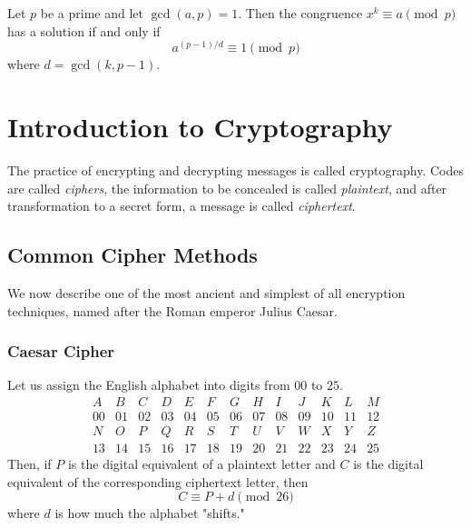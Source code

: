 \documentclass{article}
\begin{document}
\begin{corollary}
  \label{thm:eulers-criterion-for-kth-power-residues}
Let $p$ be a prime and let $\gcd(a, p) = 1$. Then the congruence $x^k \equiv a \pmod{p}$ has a solution if and only if 
\begin{equation}
  a^{(p-1)/d} \equiv 1 \pmod{p}
\end{equation}
where $d = \gcd(k, p-1)$. 
\end{corollary}

\section{Introduction to Cryptography}

The practice of encrypting and decrypting messages is called cryptography. Codes are called \textit{ciphers}, the information to be concealed is called \textit{plaintext}, and after transformation to a secret form, a message is called \textit{ciphertext}. 

\subsection{Common Cipher Methods}

We now describe one of the most ancient and simplest of all encryption techniques, named after the Roman emperor Julius Caesar. 

\subsubsection{Caesar Cipher}
Let us assign the English alphabet into digits from $00$ to $25$. 
\begin{equation}
  \begin{array}{cccccccccccccc}
      A & B & C & D& E & F & G&H&I&J&K&L&M \\
      00 & 01 & 02 & 03 & 04&05&06&07&08&09&10&11&12 \\
      N&O&P&Q&R&S&T&U&V&W&X&Y&Z\\
      13&14&15&16&17&18&19&20&21&22&23&24&25
  \end{array}
\end{equation}
Then, if $P$ is the digital equivalent of a plaintext letter and $C$ is the digital equivalent of the corresponding ciphertext letter, then 
\begin{equation}
  C \equiv P + d \pmod{26}
\end{equation}
where $d$ is how much the alphabet "shifts."
\end{document}
